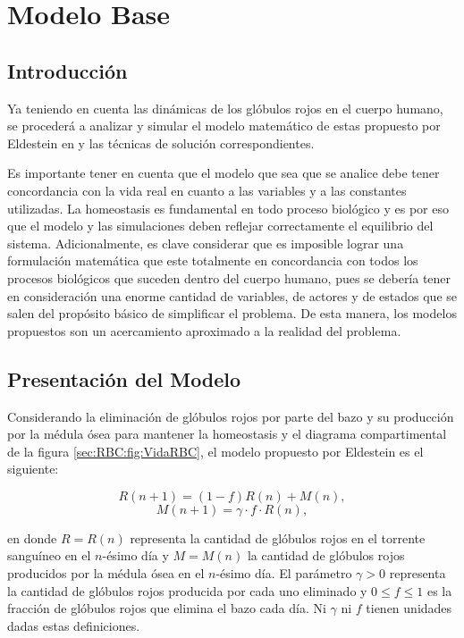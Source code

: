 
\chapter{Modelo Base}\label{chap:modelo}
\section{Introducción}\label{sec:modelo:intro}
Ya teniendo en cuenta las dinámicas de los glóbulos rojos en el cuerpo humano, se procederá a analizar y simular el modelo matemático de estas propuesto por Eldestein en \cite{edelstein2005} y las técnicas de solución correspondientes. 

Es importante tener en cuenta que el modelo que sea que se analice debe tener concordancia con la vida real en cuanto a las variables y a las constantes utilizadas. La homeostasis es fundamental en todo proceso biológico y es por eso que el modelo y las simulaciones deben reflejar correctamente el equilibrio del sistema. Adicionalmente, es clave considerar que es imposible lograr una formulación matemática que este totalmente en concordancia con todos los procesos biológicos que suceden dentro del cuerpo humano, pues se debería tener en consideración una enorme cantidad de variables, de actores y de estados que se salen del propósito básico de simplificar el problema. De esta manera, los modelos propuestos son un acercamiento aproximado a la realidad del problema.

\section{Presentación del Modelo}\label{sec:modelo:presentacion}

Considerando la eliminación de glóbulos rojos por parte del bazo y su producción por la médula ósea para mantener la homeostasis y el diagrama compartimental de la figura \ref{sec:RBC:fig:VidaRBC}, el modelo propuesto por Eldestein es el siguiente:

$$R(n+1)=(1-f)R(n)+M(n),$$
$$M(n+1)=\gamma \cdot f\cdot R(n),$$

en donde $R=R(n)$ representa la cantidad de glóbulos rojos en el torrente sanguíneo en el $n$-ésimo día y $M=M(n)$ la cantidad de glóbulos rojos producidos por la médula ósea en el $n$-ésimo día. El parámetro $\gamma>0$ representa la cantidad de glóbulos rojos producida por cada uno eliminado y $0\leq f \leq 1$ es la fracción de glóbulos rojos que elimina el bazo cada día. Ni $\gamma$ ni $f$ tienen unidades dadas estas definiciones.

